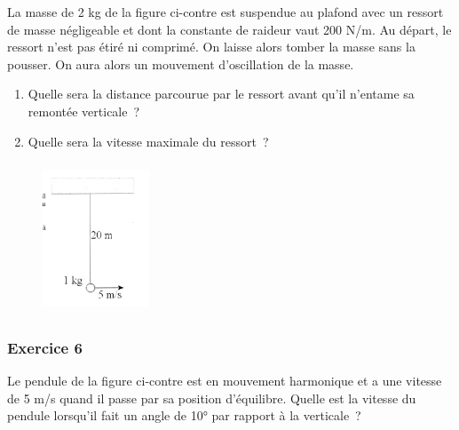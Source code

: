 La masse de 2 kg de la figure ci-contre est suspendue au plafond avec un
ressort de masse négligeable et dont la constante de raideur vaut 200
N/m. Au départ, le ressort n'est pas étiré ni comprimé. On laisse alors
tomber la masse sans la pousser. On aura alors un mouvement
d'oscillation de la masse.

\begin{enumerate}
\def\labelenumi{\alph{enumi})}
\tightlist
\item
  Quelle sera la distance parcourue par le ressort avant qu'il n'entame
  sa remontée verticale~?
\item
  Quelle sera la vitesse maximale du ressort~?
\end{enumerate}

\begin{figure}
\centering
\includegraphics[width=3.17cm,height=4.47cm]{Pictures/1000000000000BC400000F1CA9B74E9E2E8AAFA4.png}
\caption{}
\end{figure}

\hypertarget{exercice-6}{%
\subsubsection[Exercice
6]{\texorpdfstring{\protect\hypertarget{anchor-12}{}{}Exercice
6}{Exercice 6}}\label{exercice-6}}

Le pendule de la figure ci-contre est en mouvement harmonique et a une
vitesse de 5 m/s quand il passe par sa position d'équilibre. Quelle est
la vitesse du pendule lorsqu'il fait un angle de 10° par rapport à la
verticale~?

